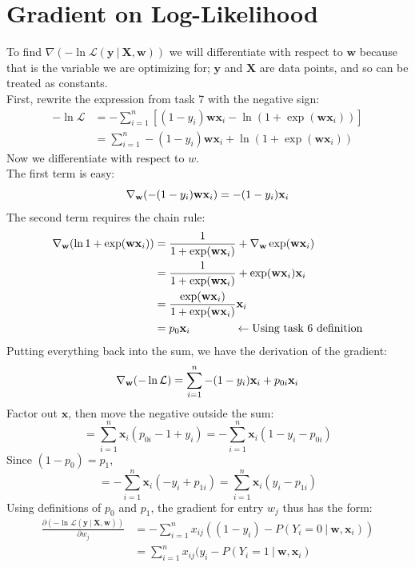 \documentclass{article}
\renewcommand{\vec}[1]{%
	\mathbf{#1}%
}
\newcommand{\gv}{%
	\:|\:
}
\begin{document}
	\section{Gradient on Log-Likelihood}
	To find $\nabla(-\ln\mathcal{L}(\vec{y}\gv \vec{X},\vec{w}))$ we will differentiate with respect to $\vec{w}$ because that is the variable we are optimizing for; $\vec{y}$ and $\vec{X}$ are data points, and so can be treated as constants.\\
	First, rewrite the expression from task 7 with the negative sign:
	\begin{align*}
		-\ln\mathcal{L} &= -\sum_{i=1}^n \left[ (1-y_i)\vec{w}\vec{x}_i - \ln(1+\exp(\vec{w}\vec{x}_i)) \right]\\
		&= \sum_{i=1}^n -(1-y_i)\vec{w}\vec{x}_i + \ln(1+\exp(\vec{w}\vec{x}_i))
	\end{align*}
	Now we differentiate with respect to $w$.\\
	The first term is easy:
	\[ \nabla_{\vec{w}}(-(1-y_i)\vec{w}\vec{x}_i) = -(1-y_i)\vec{x}_i \]
	The second term requires the chain rule:
	\begin{align*}
		\nabla_{\vec{w}} (\ln1+\exp(\vec{w}\vec{x}_i)) &= \frac{1}{1+\exp(\vec{w}\vec{x}_i)} + \nabla_{\vec{w}} \exp(\vec{w}\vec{x}_i)\\
		&= \frac{1}{1+\exp(\vec{w}\vec{x}_i)} + \exp(\vec{w}\vec{x}_i)\vec{x}_i\\
		&= \frac{\exp(\vec{w}\vec{x}_i)}{1+\exp(\vec{w}\vec{x}_i)}\vec{x}_i\\
		&= p_0\vec{x}_i \qquad\qquad \leftarrow \text{Using task 6 definition}
	\end{align*}
	Putting everything back into the sum, we have the derivation of the gradient:
	\[
		\nabla_{\vec{w}} (-\ln\mathcal{L}) = \sum_{i=1}^n -(1-y_i)\vec{x}_i + p_{0i}\vec{x}_i
	\]
	Factor out $\vec{x}$, then move the negative outside the sum:
	\[
		= \sum_{i=1}^n \vec{x}_i(p_{0i} - 1 + y_i) 
		 = \boxed{- \sum_{i=1}^n \vec{x}_i(1 - y_i - p_{0i})}
	\]
	Since $(1 - p_0) = p_1$,
	\[ = -\sum_{i=1}^n \vec{x}_i(- y_i + p_{1i}) = \boxed{\sum_{i=1}^n \vec{x}_i(y_i - p_{1i})}\]
	Using definitions of $p_0$ and $p_1$, the gradient for entry $w_j$ thus has the form:
	\begin{align*}
		\frac{\partial(-\ln\mathcal{L}(\vec{y}\gv\vec{X},\vec{w}))}{\partial w_j} &= \boxed{- \sum_{i=1}^n x_{ij}((1 - y_i) - P(Y_i = 0\gv\vec{w},\vec{x}_i))}\\
		&= \boxed{\sum_{i=1}^n x_{ij}(y_i - P(Y_i = 1\gv\vec{w},\vec{x}_i)}
	\end{align*}
	
\end{document}
